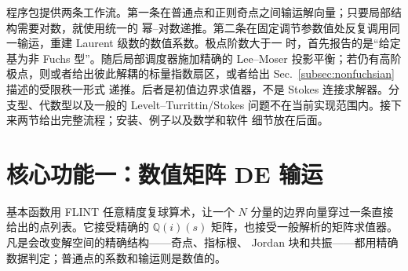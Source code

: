 \documentclass[11pt,a4paper]{ctexart}
\renewcommand{\_}{\origunderscore\allowbreak}
\begin{document}
程序包提供两条工作流。第一条在普通点和正则奇点之间输运解向量；只要局部结构需要对数，就使用统一的
幂--对数递推。第二条在固定调节参数值处反复调用同一输运，重建 Laurent 级数的数值系数。极点阶数大于一
时，首先报告的是“给定基为非 Fuchs 型”。随后局部调度器施加精确的 Lee--Moser 投影平衡；若仍有高阶
极点，则或者给出彼此解耦的标量指数扇区，或者给出 Sec.~\ref{subsec:nonfuchsian} 描述的受限秩一形式
递推。后者是初值边界求值器，不是 Stokes 连接求解器。分支型、代数型以及一般的
Levelt--Turrittin/Stokes 问题不在当前实现范围内。接下来两节给出完整流程；安装、例子以及数学和软件
细节放在后面。

\section{核心功能一：数值矩阵 DE 输运}
\label{sec:numerical-core}

基本函数用 FLINT 任意精度复球算术，让一个 $N$ 分量的边界向量穿过一条直接给出的点列表。它接受精确的
$\mathbb Q(i)(s)$ 矩阵，也接受一般解析的矩阵求值器。凡是会改变解空间的精确结构——奇点、指标根、
Jordan 块和共振——都用精确数据判定；普通点的系数和输运则是数值的。
\end{document}
